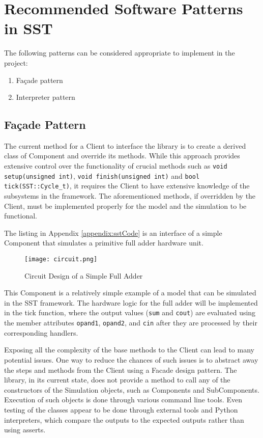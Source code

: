 \section{Recommended Software Patterns in SST}
The following patterns can be considered appropriate to implement in the project:
\begin{enumerate}
    \item Façade pattern
    \item Interpreter pattern
\end{enumerate}

\subsection{Façade Pattern}
The current method for a Client to interface the library is to create a derived class of Component and override its methods. While this approach provides extensive control over the functionality of crucial methods such as \texttt{void setup(unsigned int)}, \texttt{void finish(unsigned int)} and \texttt{bool tick(SST::Cycle\_t)}, it requires the Client to have extensive knowledge of the subsystems in the framework. The aforementioned methods, if overridden by the Client, must be implemented properly for the model and the simulation to be functional.

The listing in Appendix \ref{appendix:sstCode} is an interface of a simple Component that simulates a primitive full adder hardware unit.

\begin{figure}[h]
    \caption{Circuit Design of a Simple Full Adder}
    \centering
    \texttt{[image: circuit.png]}
\end{figure}

This Component is a relatively simple example of a model that can be simulated in the SST framework. The hardware logic for the full adder will be implemented in the tick function, where the output values (\texttt{sum} and \texttt{cout}) are evaluated using the member attributes \texttt{opand1}, \texttt{opand2}, and \texttt{cin} after they are processed by their corresponding handlers.

Exposing all the complexity of the base methods to the Client can lead to many potential issues. One way to reduce the chances of such issues is to abstract away the steps and methods from the Client using a Facade design pattern. The library, in its current state, does not provide a method to call any of the constructors of the Simulation objects, such as Components and SubComponents. Execution of such objects is done through various command line tools. Even testing of the classes appear to be done through external tools and Python interpreters, which compare the outputs to the expected outputs rather than using asserts.

